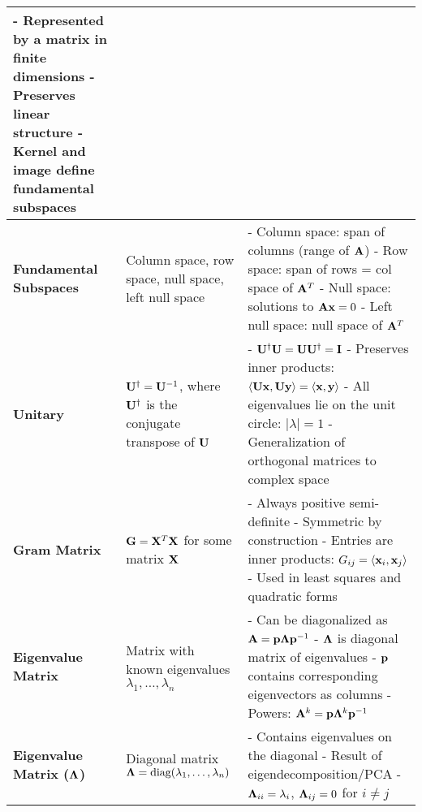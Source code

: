 \documentclass[12pt]{article}
\begin{document}
\begin{longtable}{|>{\bfseries}m{3.5cm}|m{5cm}|m{10.5cm}|}
		- Represented by a matrix in finite dimensions \newline
		- Preserves linear structure \newline
		- Kernel and image define fundamental subspaces \\
		\hline
		Fundamental Subspaces & Column space, row space, null space, left null space &
		- Column space: span of columns (range of $\mathbf{A}$) \newline
		- Row space: span of rows = col space of $\mathbf{A}^T$ \newline
		- Null space: solutions to $\mathbf{A}\mathbf{x} = 0$ \newline
		- Left null space: null space of $\mathbf{A}^T$ \\
		\hline
		Unitary & $\mathbf{U}^\dagger = \mathbf{U}^{-1}$, where $\mathbf{U}^\dagger$ is the conjugate
		transpose of $\mathbf{U}$ &
		- $\mathbf{U}^\dagger \mathbf{U} = \mathbf{U} \mathbf{U}^\dagger = \mathbf{I}$ \newline
		- Preserves inner products: $\langle \mathbf{U}\mathbf{x}, \mathbf{U}\mathbf{y} \rangle =
		\langle \mathbf{x}, \mathbf{y} \rangle$ \newline
		- All eigenvalues lie on the unit circle: $|\lambda| = 1$ \newline
		- Generalization of orthogonal matrices to complex space \\
		\hline
		Gram Matrix & $\mathbf{G} = \mathbf{X}^T \mathbf{X}$ for some matrix $\mathbf{X}$ &
		- Always positive semi-definite \newline
		- Symmetric by construction \newline
		- Entries are inner products: $G_{ij} = \langle \mathbf{x}_i, \mathbf{x}_j \rangle$ \newline
		- Used in least squares and quadratic forms \\
		\hline
		Eigenvalue Matrix & Matrix with known eigenvalues $\lambda_1, \ldots, \lambda_n$ &
		- Can be diagonalized as $\mathbf{A} = \mathbf{p}\mathbf{\Lambda} \mathbf{p}^{-1}$ \newline
		- $\mathbf{\Lambda}$ is diagonal matrix of eigenvalues \newline
		- $\mathbf{p}$ contains corresponding eigenvectors as columns \newline
		- Powers: $\mathbf{A}^k = \mathbf{p}\mathbf{\Lambda}^k \mathbf{p}^{-1}$ \\
		\hline
		Eigenvalue Matrix ($\mathbf{\Lambda}$) & Diagonal matrix $\mathbf{\Lambda} = \text{diag}(\lambda_1,
		\ldots, \lambda_n)$ &
		- Contains eigenvalues on the diagonal \newline
		- Result of eigendecomposition/PCA \newline
		- $\mathbf{\Lambda}_{ii} = \lambda_i$, $\mathbf{\Lambda}_{ij} = 0$ for $i \neq j$ \newline

\end{longtable}
\end{document}
